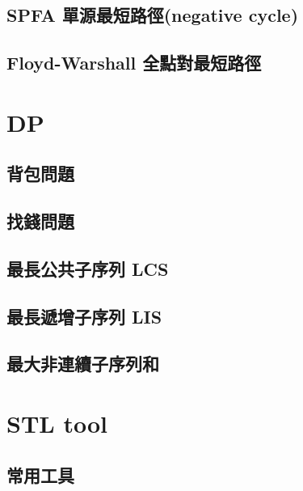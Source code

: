 \subsection{SPFA 單源最短路徑(negative cycle)}


\subsection{Floyd-Warshall 全點對最短路徑}




\section{DP}



\subsection{背包問題}


\subsection{找錢問題}


\subsection{最長公共子序列 LCS}


\subsection{最長遞增子序列 LIS}


\subsection{最大非連續子序列和}






\section{STL tool}

\subsection{常用工具}


